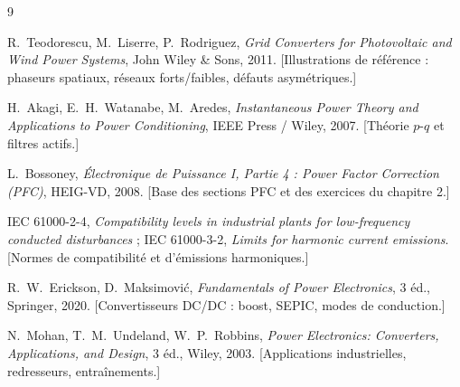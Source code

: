 \begin{thebibliography}{9}

R.~Teodorescu, M.~Liserre, P.~Rodriguez,
\emph{Grid Converters for Photovoltaic and Wind Power Systems},
John Wiley \& Sons, 2011.
[Illustrations de référence : phaseurs spatiaux, réseaux forts/faibles,
défauts asymétriques.]

H.~Akagi, E.~H.~Watanabe, M.~Aredes,
\emph{Instantaneous Power Theory and Applications to Power
Conditioning}, IEEE Press / Wiley, 2007.
[Théorie $p$-$q$ et filtres actifs.]

L.~Bossoney, \emph{Électronique de Puissance I, Partie 4 : Power
Factor Correction (PFC)}, HEIG-VD, 2008.
[Base des sections PFC et des exercices du chapitre 2.]

IEC 61000-2-4, \emph{Compatibility levels in industrial plants for
low-frequency conducted disturbances} ; IEC 61000-3-2, \emph{Limits
for harmonic current emissions}.
[Normes de compatibilité et d'émissions harmoniques.]

R.~W.~Erickson, D.~Maksimović,
\emph{Fundamentals of Power Electronics}, 3\ieme{} éd., Springer, 2020.
[Convertisseurs DC/DC : boost, SEPIC, modes de conduction.]

N.~Mohan, T.~M.~Undeland, W.~P.~Robbins,
\emph{Power Electronics: Converters, Applications, and Design},
3\ieme{} éd., Wiley, 2003.
[Applications industrielles, redresseurs, entraînements.]

\end{thebibliography}